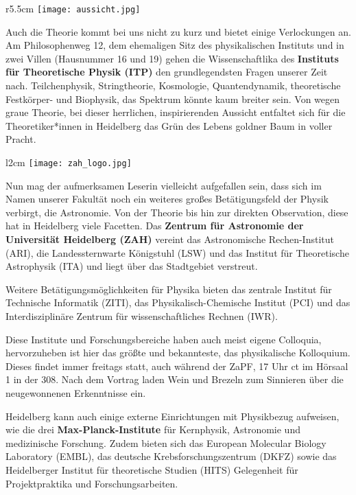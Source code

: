 \begin{wrapfigure}{r}{5.5cm}
\texttt{[image: aussicht.jpg]}
\end{wrapfigure}

Auch die Theorie kommt bei uns nicht zu kurz und bietet einige Verlockungen an. Am Philosophenweg 12, dem ehemaligen Sitz des physikalischen Instituts und in zwei Villen (Hausnummer 16 und 19) gehen die Wissenschaftlika des \textbf{Instituts für Theoretische Physik (ITP)} den grundlegendsten Fragen unserer Zeit nach. Teilchenphysik, Stringtheorie, Kosmologie, Quantendynamik, theoretische Festkörper- und Biophysik, das Spektrum könnte kaum breiter sein. Von wegen graue Theorie, bei dieser herrlichen, inspirierenden Aussicht entfaltet sich für die Theoretiker*innen in Heidelberg das Grün des Lebens goldner Baum in voller Pracht.
\begin{wrapfigure}{l}{2cm}
\texttt{[image: zah\_logo.jpg]}
\end{wrapfigure}

Nun mag der aufmerksamen Leserin vielleicht aufgefallen sein, dass sich im Namen unserer Fakultät noch ein weiteres großes Betätigungsfeld der Physik verbirgt, die Astronomie. Von der Theorie bis hin zur direkten Observation, diese hat in Heidelberg viele Facetten.
Das \textbf{Zentrum für Astronomie der Universität Heidelberg (ZAH)} vereint das
Astronomische Rechen-Institut (ARI), die Landessternwarte Königstuhl (LSW) und das Institut für Theoretische Astrophysik (ITA) und liegt über das Stadtgebiet verstreut. 

Weitere Betätigungsmöglichkeiten für Physika bieten das zentrale Institut für Technische Informatik (ZITI), das Physikalisch-Chemische Institut (PCI) und das Interdisziplinäre Zentrum für wissenschaftliches Rechnen (IWR).

Diese Institute und Forschungsbereiche haben auch meist eigene Colloquia, hervorzuheben ist hier das größte und bekannteste, das physikalische Kolloquium. Dieses findet immer freitags statt, auch während der ZaPF, 17 Uhr ct im Hörsaal 1 in der 308. Nach dem Vortrag laden Wein und Brezeln zum Sinnieren über die neugewonnenen Erkenntnisse ein.

Heidelberg kann auch einige externe Einrichtungen mit Physikbezug aufweisen, wie die drei \textbf{Max-Planck-Institute} für Kernphysik, Astronomie und medizinische Forschung. Zudem bieten sich das European Molecular Biology Laboratory (EMBL), das deutsche Krebsforschungszentrum (DKFZ) sowie das Heidelberger Institut für theoretische Studien (HITS) Gelegenheit für Projektpraktika und Forschungsarbeiten.

